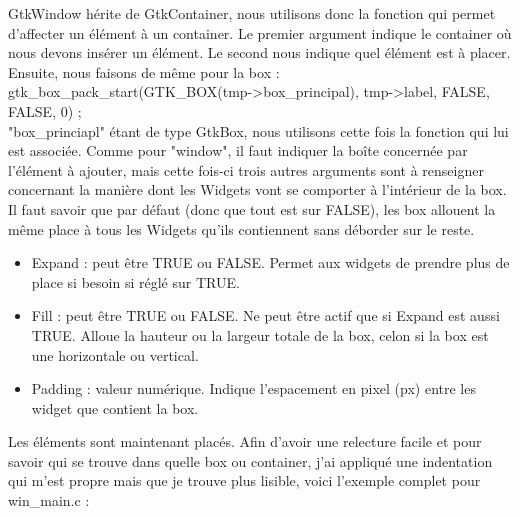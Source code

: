 \documentclass[11pt,french,a4paper]{report}
\begin{document}
GtkWindow hérite de GtkContainer, nous utilisons donc la fonction qui permet d'affecter un élément à un container. Le premier argument 
indique le container où nous devons insérer un élément. Le second nous indique quel élément est à placer. \\

Ensuite, nous faisons de même pour la box : \\

  gtk\_box\_pack\_start(GTK\_BOX(tmp->box\_principal), tmp->label, FALSE, FALSE, 0) ; \\

"box\_princiapl" étant de type GtkBox, nous utilisons cette fois la fonction qui lui est associée. 
Comme pour "window", il faut indiquer la boîte concernée par l'élément à ajouter, mais cette fois-ci trois autres arguments 
sont à renseigner concernant la manière dont les Widgets vont se comporter à l'intérieur de la box. \\ 

Il faut savoir que par défaut (donc que tout est sur FALSE), les box allouent la même place à tous les Widgets qu'ils contiennent
sans déborder sur le reste.\\

\begin{itemize}
    \item Expand : peut être TRUE ou FALSE. Permet aux widgets de prendre plus de place si besoin si réglé sur TRUE. \\ 
    \item Fill : peut être TRUE ou FALSE. Ne peut être actif que si Expand est aussi TRUE. Alloue la hauteur ou la largeur totale
        de la box, 
        celon si la box est une horizontale ou vertical. \\
    \item Padding : valeur numérique. Indique l'espacement en pixel (px) entre les widget que contient la box. \\ 
\end{itemize}

Les éléments sont maintenant placés. Afin d'avoir une relecture facile et pour savoir qui se trouve dans quelle box ou container, 
j'ai appliqué une indentation  qui m'est propre mais que je trouve plus lisible, voici l'exemple complet pour win\_main.c : \\
\end{document}

